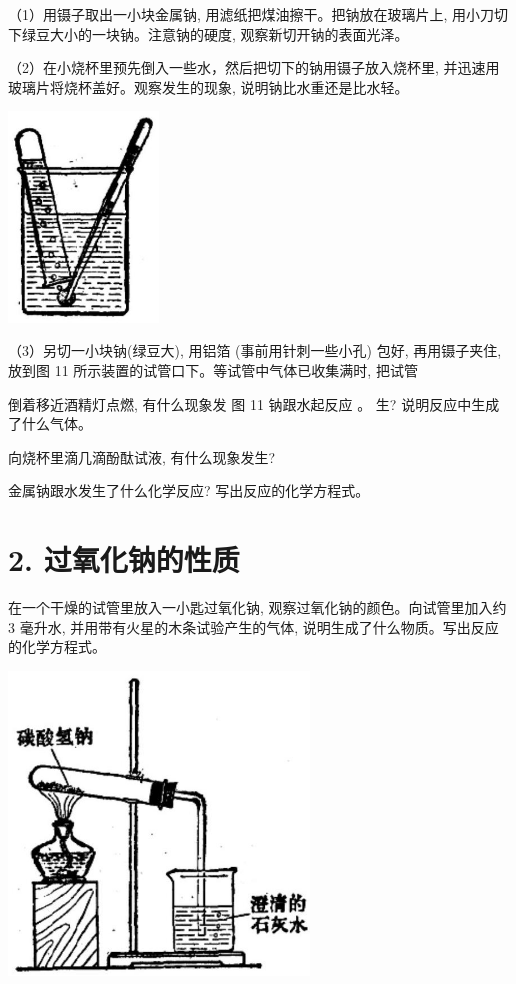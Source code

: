 \documentclass[10pt]{article}
\begin{document}
（1）用镊子取出一小块金属钠, 用滤纸把煤油擦干。把钠放在玻璃片上, 用小刀切下绿豆大小的一块钠。注意钠的硬度, 观察新切开钠的表面光泽。

（2）在小烧杯里预先倒入一些水，然后把切下的钠用镊子放入烧杯里, 并迅速用玻璃片将烧杯盖好。观察发生的现象, 说明钠比水重还是比水轻。

\begin{center}
\includegraphics[max width=0.3\textwidth]{images/01912d0f-097c-7e75-8f32-4f326cd86c9f_164_973616.jpg}
\end{center}

（3）另切一小块钠(绿豆大), 用铝箔 (事前用针刺一些小孔) 包好, 再用镊子夹住, 放到图 11 所示装置的试管口下。等试管中气体已收集满时, 把试管

倒着移近酒精灯点燃, 有什么现象发 图 11 钠跟水起反应 。 生? 说明反应中生成了什么气体。

向烧杯里滴几滴酚酞试液, 有什么现象发生?

金属钠跟水发生了什么化学反应? 写出反应的化学方程式。

\section*{2. 过氧化钠的性质}

在一个干燥的试管里放入一小匙过氧化钠, 观察过氧化钠的颜色。向试管里加入约 3 毫升水, 并用带有火星的木条试验产生的气体, 说明生成了什么物质。写出反应的化学方程式。

\begin{center}
\includegraphics[max width=0.6\textwidth]{images/01912d0f-097c-7e75-8f32-4f326cd86c9f_165_726376.jpg}
\end{center}
\end{document}
